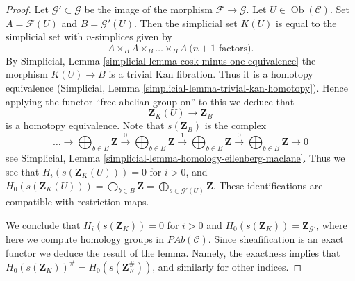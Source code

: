 \documentclass[10pt,a4paper]{amsart}
\theoremstyle{plain}
\theoremstyle{definition}
\theoremstyle{remark}
\numberwithin{equation}{subsection}
\def\Ob{\mathop{\mathrm{Ob}}\nolimits}
\begin{document}
\begin{proof}
Let $\mathcal{G}' \subset \mathcal{G}$ be the image of
the morphism $\mathcal{F} \to \mathcal{G}$.
Let $U \in \Ob(\mathcal{C})$. Set
$A = \mathcal{F}(U)$ and $B = \mathcal{G}'(U)$.
Then the simplicial set $K(U)$ is equal to the simplicial
set with $n$-simplices given by
$$
A \times_B A \times_B \ldots \times_B A\ (n + 1 \text{ factors)}.
$$
By Simplicial, Lemma \ref{simplicial-lemma-cosk-minus-one-equivalence}
the morphism $K(U) \to B$ is a trivial Kan fibration.
Thus it is a homotopy equivalence
(Simplicial, Lemma \ref{simplicial-lemma-trivial-kan-homotopy}).
Hence applying the functor ``free abelian group on'' to this
we deduce that
$$
\mathbf{Z}_K(U) \longrightarrow \mathbf{Z}_B
$$
is a homotopy equivalence. Note that $s(\mathbf{Z}_B)$ is
the complex
$$
\ldots \to
\bigoplus\nolimits_{b \in B}\mathbf{Z} \xrightarrow{0}
\bigoplus\nolimits_{b \in B}\mathbf{Z} \xrightarrow{1}
\bigoplus\nolimits_{b \in B}\mathbf{Z} \xrightarrow{0}
\bigoplus\nolimits_{b \in B}\mathbf{Z} \to 0
$$
see Simplicial, Lemma \ref{simplicial-lemma-homology-eilenberg-maclane}.
Thus we see that
$H_i(s(\mathbf{Z}_K(U))) = 0$ for $i > 0$, and
$H_0(s(\mathbf{Z}_K(U))) = \bigoplus_{b \in B}\mathbf{Z}
= \bigoplus_{s \in \mathcal{G}'(U)} \mathbf{Z}$.
These identifications are compatible with restriction
maps.

\medskip\noindent
We conclude that $H_i(s(\mathbf{Z}_K)) = 0$ for $i > 0$ and
$H_0(s(\mathbf{Z}_K)) = \mathbf{Z}_{\mathcal{G}'}$, where here
we compute homology groups in $\textit{PAb}(\mathcal{C})$. Since
sheafification is an exact functor we deduce the result
of the lemma. Namely, the exactness implies
that $H_0(s(\mathbf{Z}_K))^\# = H_0(s(\mathbf{Z}_K^\#))$,
and similarly for other indices.
\end{proof}
\end{document}
